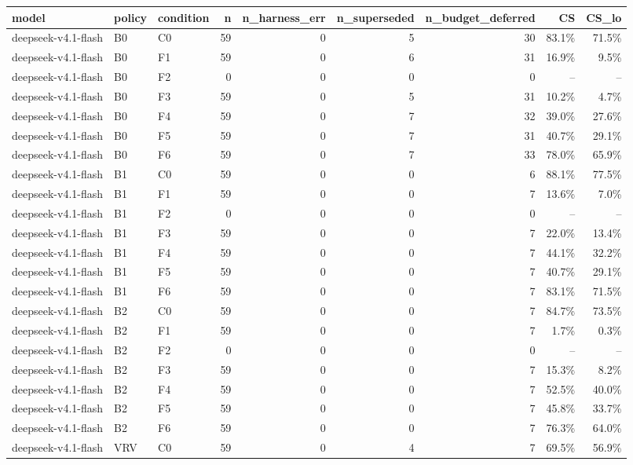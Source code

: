 \begin{tabular}{lllrrrrrr}
\toprule
model & policy & condition & n & n\_harness\_err & n\_superseded & n\_budget\_deferred & CS & CS\_lo \\
\midrule
deepseek-v4.1-flash & B0 & C0 & 59 & 0 & 5 & 30 & 83.1\% & 71.5\% \\
deepseek-v4.1-flash & B0 & F1 & 59 & 0 & 6 & 31 & 16.9\% & 9.5\% \\
deepseek-v4.1-flash & B0 & F2 & 0 & 0 & 0 & 0 & -- & -- \\
deepseek-v4.1-flash & B0 & F3 & 59 & 0 & 5 & 31 & 10.2\% & 4.7\% \\
deepseek-v4.1-flash & B0 & F4 & 59 & 0 & 7 & 32 & 39.0\% & 27.6\% \\
deepseek-v4.1-flash & B0 & F5 & 59 & 0 & 7 & 31 & 40.7\% & 29.1\% \\
deepseek-v4.1-flash & B0 & F6 & 59 & 0 & 7 & 33 & 78.0\% & 65.9\% \\
deepseek-v4.1-flash & B1 & C0 & 59 & 0 & 0 & 6 & 88.1\% & 77.5\% \\
deepseek-v4.1-flash & B1 & F1 & 59 & 0 & 0 & 7 & 13.6\% & 7.0\% \\
deepseek-v4.1-flash & B1 & F2 & 0 & 0 & 0 & 0 & -- & -- \\
deepseek-v4.1-flash & B1 & F3 & 59 & 0 & 0 & 7 & 22.0\% & 13.4\% \\
deepseek-v4.1-flash & B1 & F4 & 59 & 0 & 0 & 7 & 44.1\% & 32.2\% \\
deepseek-v4.1-flash & B1 & F5 & 59 & 0 & 0 & 7 & 40.7\% & 29.1\% \\
deepseek-v4.1-flash & B1 & F6 & 59 & 0 & 0 & 7 & 83.1\% & 71.5\% \\
deepseek-v4.1-flash & B2 & C0 & 59 & 0 & 0 & 7 & 84.7\% & 73.5\% \\
deepseek-v4.1-flash & B2 & F1 & 59 & 0 & 0 & 7 & 1.7\% & 0.3\% \\
deepseek-v4.1-flash & B2 & F2 & 0 & 0 & 0 & 0 & -- & -- \\
deepseek-v4.1-flash & B2 & F3 & 59 & 0 & 0 & 7 & 15.3\% & 8.2\% \\
deepseek-v4.1-flash & B2 & F4 & 59 & 0 & 0 & 7 & 52.5\% & 40.0\% \\
deepseek-v4.1-flash & B2 & F5 & 59 & 0 & 0 & 7 & 45.8\% & 33.7\% \\
deepseek-v4.1-flash & B2 & F6 & 59 & 0 & 0 & 7 & 76.3\% & 64.0\% \\
deepseek-v4.1-flash & VRV & C0 & 59 & 0 & 4 & 7 & 69.5\% & 56.9\% \\

\end{tabular}
